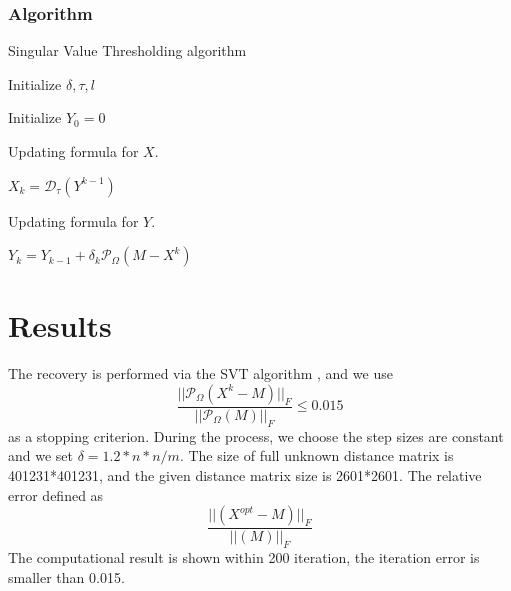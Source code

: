 \documentclass[letter,10pt]{article}
\begin{document}
\subsubsection{Algorithm}
\begin{algorithm}[H]
\caption{Singular Value Thresholding algorithm}
\begin{algorithmic}
 Initialize $\delta, \tau, l$

\qquad\qquad Initialize $Y_0 = 0$

 
 Updating formula for $X$.

\qquad\qquad $X_k=\mathcal{D}_\tau(Y^{k-1})$

 Updating formula for $Y$.

\qquad\qquad $Y_k=Y_{k-1}+\delta_k\mathcal{P}_\Omega(M-X^k)$

\ENDWHILE


\end{algorithmic}
\end{algorithm}


\section{Results}

The recovery is performed via the SVT algorithm , and we use
\begin{equation}
\frac{||\mathcal{P}_\Omega(X^k-M)||_F}{||\mathcal{P}_\Omega(M)||_F} \leq 0.015
\end{equation}
as a stopping criterion. During the process, we choose the step sizes are constant and we set $\delta = 1.2*n*n/m $. The size of full unknown distance matrix is 401231*401231, and the given distance matrix size is 2601*2601. 
The relative error defined as 
\begin{equation}
\frac{||(X^{opt}-M)||_F}{||(M)||_F} 
\end{equation}
The computational result is shown within 200 iteration, the iteration error is smaller than 0.015. 
\end{document}
